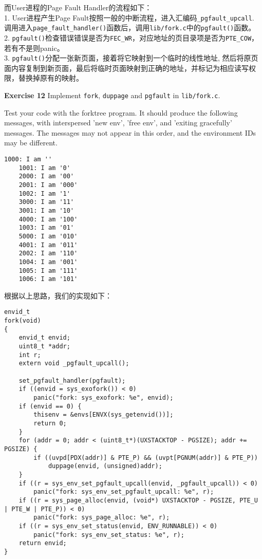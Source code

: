 \documentclass[11pt]{article}
\begin{document}
而User进程的Page Fault Handler的流程如下：\\
1. User进程产生Page Fault按照一般的中断流程，进入汇编码\lstinline|_pgfault_upcall|. 调用进入\lstinline|page_fault_handler()|函数后，调用\lstinline|lib/fork.c|中的\lstinline|pgfault()|函数。\\
2. \lstinline|pgfault()|检查错误错误是否为\lstinline|FEC_WR|，对应地址的页目录项是否为\lstinline|PTE_COW|，若有不是则panic。 \\
3. \lstinline|pgfault()|分配一张新页面，接着将它映射到一个临时的线性地址, 然后将原页面内容复制到新页面，最后将临时页面映射到正确的地址，并标记为相应读写权限，替换掉原有的映射。 \\

\begin{framed}
\noindent\textbf{Exercise 12} Implement \lstinline|fork|, \lstinline|duppage| and \lstinline|pgfault| in \lstinline|lib/fork.c|.

Test your code with the forktree program. It should produce the following messages, with interspersed 'new env', 'free env', and 'exiting gracefully' messages. The messages may not appear in this order, and the environment IDs may be different.

\begin{lstlisting}[aboveskip=-1.5em,frame=none]
	1000: I am ''
	1001: I am '0'
	2000: I am '00'
	2001: I am '000'
	1002: I am '1'
	3000: I am '11'
	3001: I am '10'
	4000: I am '100'
	1003: I am '01'
	5000: I am '010'
	4001: I am '011'
	2002: I am '110'
	1004: I am '001'
	1005: I am '111'
	1006: I am '101'
\end{lstlisting}
\end{framed}

根据以上思路，我们的实现如下：
\begin{lstlisting}[title=lib/fork.c]
envid_t
fork(void)
{
	envid_t envid;
	uint8_t *addr;
	int r;
	extern void _pgfault_upcall(); 

	set_pgfault_handler(pgfault);
	if ((envid = sys_exofork()) < 0)
		panic("fork: sys_exofork: %e", envid);
	if (envid == 0) {
		thisenv = &envs[ENVX(sys_getenvid())];
		return 0;
	}
	for (addr = 0; addr < (uint8_t*)(UXSTACKTOP - PGSIZE); addr += PGSIZE) {
		if ((uvpd[PDX(addr)] & PTE_P) && (uvpt[PGNUM(addr)] & PTE_P))
			duppage(envid, (unsigned)addr);
	}
	if ((r = sys_env_set_pgfault_upcall(envid, _pgfault_upcall)) < 0)
		panic("fork: sys_env_set_pgfault_upcall: %e", r);
	if ((r = sys_page_alloc(envid, (void*) UXSTACKTOP - PGSIZE, PTE_U | PTE_W | PTE_P)) < 0)
		panic("fork: sys_page_alloc: %e", r);
	if ((r = sys_env_set_status(envid, ENV_RUNNABLE)) < 0)
		panic("fork: sys_env_set_status: %e", r);
	return envid;
}
\end{lstlisting}
\end{document}
